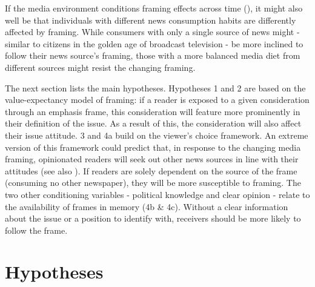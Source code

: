 \documentclass{article}
\begin{document}
If the media environment conditions framing effects across time (\cite{Bennett2008}), it might also well be that individuals with different news consumption habits are differently affected by framing. While consumers with only a single source of news might - similar to citizens in the golden age of broadcast television - be more inclined to follow their news source's framing, those with a more balanced media diet from different sources might resist the changing framing.


The next section lists the main hypotheses. Hypotheses 1 and 2 are based on the value-expectancy model of framing: if a reader is exposed to a given consideration through an emphasis frame, this consideration will feature more prominently in their definition of the issue. As a result of this, the consideration will also affect their issue attitude. 3 and 4a build on the viewer's choice framework. An extreme version of this framework could predict that, in response to the changing media framing, opinionated readers will seek out other news sources in line with their attitudes (see also \cite{Spirig2020}). If readers are solely dependent on the source of the frame (consuming no other newspaper), they will be more susceptible to framing. The two other conditioning variables - political knowledge and clear opinion - relate to the availability of frames in memory (4b \& 4c). Without a clear information about the issue or a position to identify with, receivers should be more likely to follow the frame. %

\section{Hypotheses}
\end{document}
